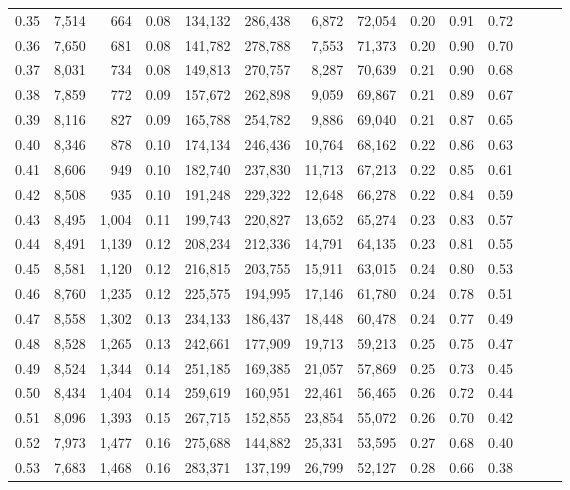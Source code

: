 \begin{tabular}{rrrrrrrrrrrrrr}
0.35 &  7,514 &    664 &  0.08 &  134,132 &  286,438 &   6,872 &  72,054 &  0.20 &  0.91 &      0.72 \\
0.36 &  7,650 &    681 &  0.08 &  141,782 &  278,788 &   7,553 &  71,373 &  0.20 &  0.90 &      0.70 \\
0.37 &  8,031 &    734 &  0.08 &  149,813 &  270,757 &   8,287 &  70,639 &  0.21 &  0.90 &      0.68 \\
0.38 &  7,859 &    772 &  0.09 &  157,672 &  262,898 &   9,059 &  69,867 &  0.21 &  0.89 &      0.67 \\
0.39 &  8,116 &    827 &  0.09 &  165,788 &  254,782 &   9,886 &  69,040 &  0.21 &  0.87 &      0.65 \\
0.40 &  8,346 &    878 &  0.10 &  174,134 &  246,436 &  10,764 &  68,162 &  0.22 &  0.86 &      0.63 \\
0.41 &  8,606 &    949 &  0.10 &  182,740 &  237,830 &  11,713 &  67,213 &  0.22 &  0.85 &      0.61 \\
0.42 &  8,508 &    935 &  0.10 &  191,248 &  229,322 &  12,648 &  66,278 &  0.22 &  0.84 &      0.59 \\
0.43 &  8,495 &  1,004 &  0.11 &  199,743 &  220,827 &  13,652 &  65,274 &  0.23 &  0.83 &      0.57 \\
0.44 &  8,491 &  1,139 &  0.12 &  208,234 &  212,336 &  14,791 &  64,135 &  0.23 &  0.81 &      0.55 \\
0.45 &  8,581 &  1,120 &  0.12 &  216,815 &  203,755 &  15,911 &  63,015 &  0.24 &  0.80 &      0.53 \\
0.46 &  8,760 &  1,235 &  0.12 &  225,575 &  194,995 &  17,146 &  61,780 &  0.24 &  0.78 &      0.51 \\
0.47 &  8,558 &  1,302 &  0.13 &  234,133 &  186,437 &  18,448 &  60,478 &  0.24 &  0.77 &      0.49 \\
0.48 &  8,528 &  1,265 &  0.13 &  242,661 &  177,909 &  19,713 &  59,213 &  0.25 &  0.75 &      0.47 \\
0.49 &  8,524 &  1,344 &  0.14 &  251,185 &  169,385 &  21,057 &  57,869 &  0.25 &  0.73 &      0.45 \\
0.50 &  8,434 &  1,404 &  0.14 &  259,619 &  160,951 &  22,461 &  56,465 &  0.26 &  0.72 &      0.44 \\
0.51 &  8,096 &  1,393 &  0.15 &  267,715 &  152,855 &  23,854 &  55,072 &  0.26 &  0.70 &      0.42 \\
0.52 &  7,973 &  1,477 &  0.16 &  275,688 &  144,882 &  25,331 &  53,595 &  0.27 &  0.68 &      0.40 \\
0.53 &  7,683 &  1,468 &  0.16 &  283,371 &  137,199 &  26,799 &  52,127 &  0.28 &  0.66 &      0.38 \\

\end{tabular}

